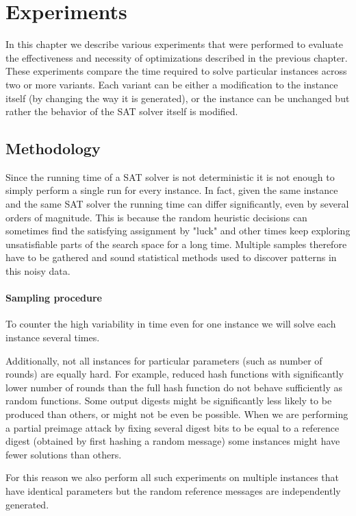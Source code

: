 \chapter{Experiments}

In this chapter we describe various experiments that were performed to evaluate the effectiveness and necessity of optimizations described in the previous chapter.
These experiments compare the time required to solve particular instances across two or more variants.
Each variant can be either a modification to the instance itself (by changing the way it is generated), or the instance can be unchanged but rather the behavior of the SAT solver itself is modified.

\section{Methodology}
Since the running time of a SAT solver is not deterministic it is not enough to simply perform a single run for every instance.
In fact, given the same instance and the same SAT solver the running time can differ significantly, even by several orders of magnitude.
This is because the random heuristic decisions can sometimes find the satisfying assignment by "luck" and other times keep exploring unsatisfiable parts of the search space for a long time.
Multiple samples therefore have to be gathered and sound statistical methods used to discover patterns in this noisy data.

\subsubsection{Sampling procedure}
To counter the high variability in time even for one instance we will solve each instance several times.

Additionally, not all instances for particular parameters (such as number of rounds) are equally hard.
For example, reduced hash functions with significantly lower number of rounds than the full hash function do not behave sufficiently as random functions.
Some output digests might be significantly less likely to be produced than others, or might not be even be possible.
When we are performing a partial preimage attack by fixing several digest bits to be equal to a reference digest (obtained by first hashing a random message) some instances might have fewer solutions than others.

For this reason we also perform all such experiments on multiple instances that have identical parameters but the random reference messages are independently generated.

